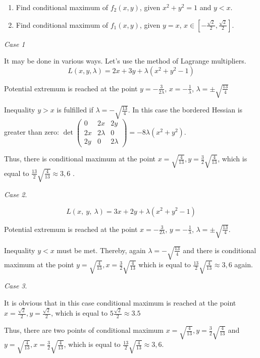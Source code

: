 \documentclass[addpoints]{exam} %
\begin{document}
\begin{questions}
\begin{solution}
\begin{enumerate}
\item  Find conditional maximum of $f_2\left(x,y\right)$, given $x^2+y^2=1$ and $y<x$.

\item  Find conditional maximum of $f_1\left(x,y\right)$, given $y=x$, $x\in \left[-\frac{\sqrt{2}}{2},\frac{\sqrt{2}}{2}\right]$.
\end{enumerate}

\textit{Case 1}

It may be done in various ways. Let's use the method of Lagrange multipliers.
\[L\left(x, y, \lambda\right)=2x+3y+\lambda \left(x^2+y^2-1\right)\] 

Potential extremum is reached at the point $y=-\frac{3}{2\lambda}$, $x=-\frac{1}{\lambda}$, $\lambda =\pm \sqrt{\frac{13}{4}}$

Inequality $y>x$ is fulfilled if $\lambda =-\sqrt{\frac{13}{4}}$.  In this case the bordered Hessian is greater than zero: $\det\left( \begin{array}{ccc}
0 & 2x & 2y \\ 
2x & 2\lambda & 0 \\ 
2y & 0 & 2\lambda \end{array}
\right)=-8\lambda\left(x^2+y^2\right)$. 

Thus, there is conditional maximum at the point $x=\sqrt{\frac{4}{13}},y=\frac{3}{2}\sqrt{\frac{4}{13}}$, which is equal to $\frac{13}{2}\sqrt{\frac{4}{13}}\approx 3,6$ .

\textit{Case 2}.

\[L\left(x,\ y,\ \lambda\right)=3x+2y+\lambda\left(x^2+y^2-1\right)\] 

Potential extremum is reached at the point $x=-\frac{3}{2\lambda}$, $y=-\frac{1}{\lambda}$, $\lambda=\pm \sqrt{\frac{13}{4}}$. 

Inequality $y<x$ must be met. Thereby, again $\lambda=-\sqrt{\frac{13}{4}}$ and there is conditional maximum at the point $y=\sqrt{\frac{4}{13}},x=\frac{3}{2}\sqrt{\frac{4}{13}}$ which is equal to  $\frac{13}{2}\sqrt{\frac{4}{13}}\approx 3,6$ again.

\textit{Case 3}.

It is obvious that in this case conditional maximum is reached at the point $x=\frac{\sqrt{2}}{2},y=\frac{\sqrt{2}}{2}$, which is equal to $5\frac{\sqrt{2}}{2}\approx 3.5$

Thus, there are two points of conditional maximum $x=\sqrt{\frac{4}{13}},y=\frac{3}{2}\sqrt{\frac{4}{13}}$ and $y=\sqrt{\frac{4}{13}},x=\frac{3}{2}\sqrt{\frac{4}{13}}$, which is equal to $\frac{13}{2}\sqrt{\frac{4}{13}}\approx 3,6$.



\end{solution}
\end{questions}
\end{document}
